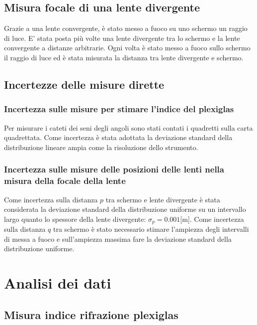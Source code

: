 \documentclass{article}
\begin{document}
\subsection{Misura focale di una lente divergente}

Grazie a una lente convergente, è stato messo a fuoco su uno schermo un raggio di luce. 
E' stata posta più volte una lente divergente tra lo schermo e la lente convergente a distanze arbitrarie. 
Ogni volta è stato messo a fuoco sullo schermo il raggio di luce ed è stata misurata la distanza tra lente divergente e schermo. 

\subsection{Incertezze delle misure dirette}


\subsubsection{Incertezza sulle misure per stimare l'indice del plexiglas}

Per misurare i cateti dei seni degli angoli sono stati contati i quadretti sulla carta quadrettata.
Come incertezza è stata adottata la  deviazione standard della distribuzione lineare ampia come la risoluzione dello strumento.

\subsubsection{Incertezza sulle misure delle posizioni delle lenti nella misura della focale della lente}

Come incertezza sulla distanza $p$ tra schermo e lente divergente è stata considerata la deviazione standard della distribuzione uniforme su un intervallo largo quanto lo spessore della lente divergente: $\sigma_p=0.001$[m].
 Come incertezza sulla distanza $q$ tra schermo è stato necessario stimare l'ampiezza degli intervalli di messa a fuoco e sull'ampiezza massima fare la deviazione standard della distribuzione uniforme.

\section{Analisi dei dati}
 
\subsection{Misura indice rifrazione plexiglas}
\end{document}
